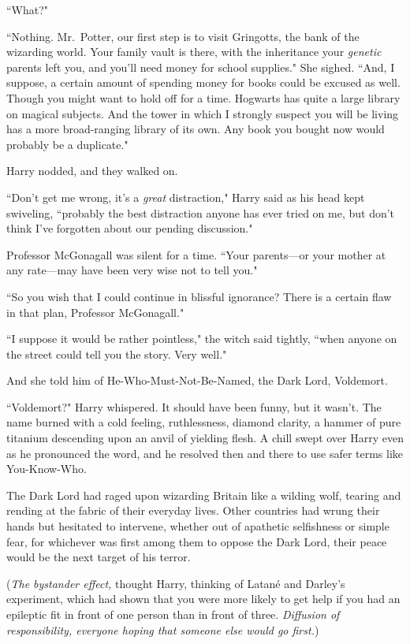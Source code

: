 ``What?"

``Nothing. Mr.~Potter, our first step is to visit Gringotts, the bank of the wizarding world. Your family vault is there, with the inheritance your \emph{genetic} parents left you, and you'll need money for school supplies." She sighed. ``And, I suppose, a certain amount of spending money for books could be excused as well. Though you might want to hold off for a time. Hogwarts has quite a large library on magical subjects. And the tower in which I strongly suspect you will be living has a more broad-ranging library of its own. Any book you bought now would probably be a duplicate."

Harry nodded, and they walked on.

``Don't get me wrong, it's a \emph{great} distraction," Harry said as his head kept swiveling, ``probably the best distraction anyone has ever tried on me, but don't think I've forgotten about our pending discussion."

Professor McGonagall was silent for a time. ``Your parents---or your mother at any rate---may have been very wise not to tell you."

``So you wish that I could continue in blissful ignorance? There is a certain flaw in that plan, Professor McGonagall."

``I suppose it would be rather pointless," the witch said tightly, ``when anyone on the street could tell you the story. Very well."

And she told him of He-Who-Must-Not-Be-Named, the Dark Lord, Voldemort.

``Voldemort?" Harry whispered. It should have been funny, but it wasn't. The name burned with a cold feeling, ruthlessness, diamond clarity, a hammer of pure titanium descending upon an anvil of yielding flesh. A chill swept over Harry even as he pronounced the word, and he resolved then and there to use safer terms like You-Know-Who.

The Dark Lord had raged upon wizarding Britain like a wilding wolf, tearing and rending at the fabric of their everyday lives. Other countries had wrung their hands but hesitated to intervene, whether out of apathetic selfishness or simple fear, for whichever was first among them to oppose the Dark Lord, their peace would be the next target of his terror.

(\emph{The bystander effect,} thought Harry, thinking of Latané and Darley's experiment, which had shown that you were more likely to get help if you had an epileptic fit in front of one person than in front of three. \emph{Diffusion of responsibility, everyone hoping that someone else would go first.})

